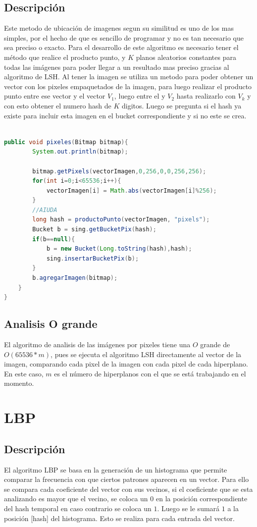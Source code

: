 \documentclass[12pt,twocolumn,letterpaper]{article}
\begin{document}
\subsection{Descripci\'on}
Este metodo de ubicaci\'on de imagenes segun su similitud es uno de los mas simples, por el hecho de que es sencillo de programar y no es tan necesario que sea preciso o exacto.
Para el desarrollo de este algoritmo es necesario tener el m\'etodo que realice el producto punto, y $K$ planos aleatorios constantes para todas las im\'agenes para poder llegar a un resultado mas preciso gracias al algoritmo de LSH.
Al tener la imagen se utiliza un metodo para poder obtener un vector con los pixeles empaquetados de la imagen, para luego realizar el producto punto entre ese vector y el vector $V_1$, luego entre el y $V_2$ hasta realizarlo con $V_k$ y con esto obtener el numero hash de $K$ digitos. Luego se pregunta si el hash ya existe para incluir esta imagen en el bucket correspondiente y si no este se crea.
\\
\begin{lstlisting}[language=Java]

public void pixeles(Bitmap bitmap){
        System.out.println(bitmap);

        bitmap.getPixels(vectorImagen,0,256,0,0,256,256);
        for(int i=0;i<65536;i++){
            vectorImagen[i] = Math.abs(vectorImagen[i]%256);
        }
        //AIUDA
        long hash = productoPunto(vectorImagen, "pixels");
        Bucket b = sing.getBucketPix(hash);
        if(b==null){
            b = new Bucket(Long.toString(hash),hash);
            sing.insertarBucketPix(b);
        }
        b.agregarImagen(bitmap);
    }
}

	\end{lstlisting}

\subsection{Analisis O grande}
El algoritmo de analisis de las im\'agenes por pixeles tiene una $O$ grande de $O(65536*m)$, pues se ejecuta el algoritmo LSH directamente al vector de la imagen, comparando cada pixel de la imagen con cada pixel de cada hiperplano. En este caso, $m$ es el n\'umero de hiperplanos con el que se est\'a trabajando en el momento. 
\section{LBP}
\subsection{Descripci\'on}
El algoritmo LBP se basa en la generaci\'on de un histograma que permite comparar la frecuencia con que ciertos patrones aparecen en un vector. Para ello se compara cada coeficiente del vector con sus vecinos, si el coeficiente que se esta analizando es mayor que el vecino, se coloca un $0$ en la posici\'on correspondiente del hash temporal en caso contrario se coloca un $1$. Luego se le sumar\'a $1$ a la posici\'on [hash] del histograma. Esto se realiza para cada entrada del vector.
\end{document}
